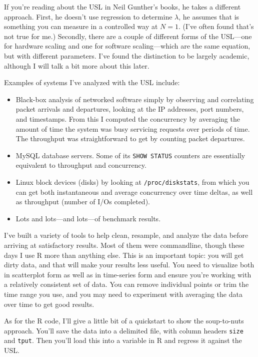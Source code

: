 \documentclass{vivid_layout}
\begin{document}
If you're reading about the USL in Neil Gunther's books, he takes a different
approach. First, he doesn't use regression to determine $\lambda$, he assumes
that is something you can measure in a controlled way at $N=1$. (I've often
found that's not true for me.) Secondly, there are a couple of different forms
of the USL---one for hardware scaling and one for software scaling---which are
the same equation, but with different parameters. I've found the distinction to
be largely academic, although I will talk a bit more about this later.

Examples of systems I've analyzed with the USL include:

\begin{itemize}
\item Black-box analysis of networked software simply by observing and
correlating packet arrivals and departures, looking at the IP addresses, port
numbers, and timestamps. From this I computed the concurrency by averaging the
amount of time the system was busy servicing requests over periods of time. The
throughput was straightforward to get by counting packet departures.
\item MySQL database servers. Some of its \texttt{SHOW STATUS} counters are
essentially equivalent to throughput and concurrency.
\item Linux block devices (disks) by looking at \texttt{/proc/diskstats}, from
which you can get both instantaneous and average concurrency over time deltas,
as well as throughput (number of I/Os completed).
\item Lots and lots---and lots---of benchmark results.
\end{itemize}

I've built a variety of tools to help clean, resample, and analyze the data
before arriving at satisfactory results. Most of them were commandline, though
these days I use R more than anything else. This is an important topic:
you will get dirty data, and that will
make your results less useful. You need to visualize both in scatterplot form as
well as in time-series form and ensure you're working with a relatively
consistent set of data. You can remove individual points or trim the time range
you use, and you may need to experiment with averaging the data over time to get
good results.

As for the R code, I'll give a little bit of a quickstart to show the
soup-to-nuts approach.  You'll save the data into a delimited file, with column
headers \texttt{size} and \texttt{tput}. Then you'll load this into a variable
in R and regress it against the USL.
\end{document}
